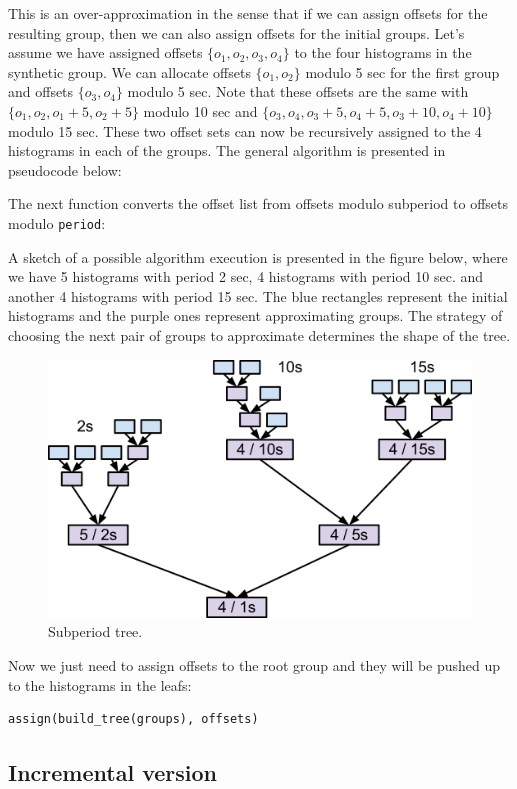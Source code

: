 This is an over-approximation in the sense that if we can assign offsets for the resulting group, then we can also assign offsets for the initial groups. Let’s assume we have assigned offsets $\{o_1,o_2,o_3,o_4\}$ to the four histograms in the synthetic group. We can allocate offsets $\{o_1, o_2\}$ modulo 5 sec for the first group and offsets $\{o_3, o_4\}$ modulo 5 sec. Note that these offsets are the same with $\{o_1, o_2, o_1 + 5, o_2 + 5\}$ modulo 10 sec and $\{o_3, o_4, o_3 + 5, o_4 + 5, o_3 + 10, o_4 + 10\}$ modulo 15 sec. These two offset sets can now be recursively assigned to the 4 histograms in each of the groups. The general algorithm is presented in pseudocode below:

The next function converts the offset list from offsets modulo subperiod to offsets modulo \verb+period+:

A sketch of a possible algorithm execution is presented in the figure below, where we have 5 histograms with period 2 sec, 4 histograms with period 10 sec. and another 4 histograms with period 15 sec. The blue rectangles represent the initial histograms and the purple ones represent approximating groups. The strategy of choosing the next pair of groups to approximate determines the shape of the tree.
\begin{figure}[ht!]
\centering
\includegraphics[scale=0.6]{Images/subperiod_tree.png}
\caption{Subperiod tree.}
\end{figure}
Now we just need to assign offsets to the root group and they will be pushed up to the histograms in the leafs:
\begin{verbatim}
assign(build_tree(groups), offsets)
\end{verbatim}

\subsection*{Incremental version}

